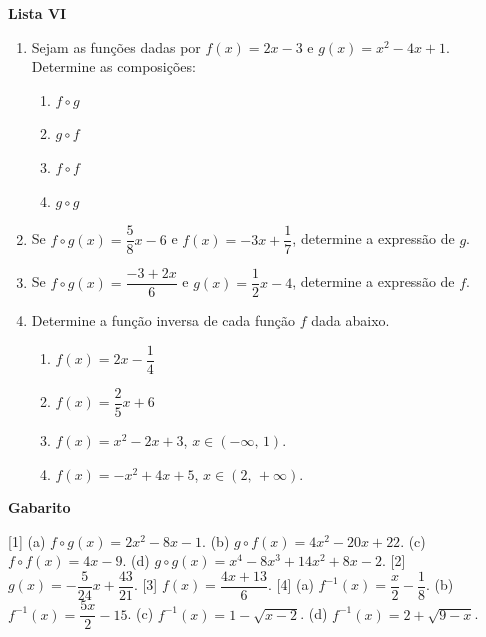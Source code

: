 \documentclass[12pt,a4paper]{article}
\begin{document}
\begin{center}
  \textbf{Lista VI}
\end{center}

\begin{enumerate}
  \item Sejam as funções dadas por $f(x) = 2x - 3$ e $g(x) = x^2 - 4x + 1$.
  Determine as composições:
    \begin{enumerate}
      \item $f\circ g$
      \item $g\circ f$
      \item $f\circ f$
      \item $g\circ g$
    \end{enumerate}

  \item Se $f\circ g(x) = \dfrac{5}{8}x - 6$ e $f(x) = -3x + \dfrac{1}{7}$,
    determine a expressão de $g$.
  
  \item Se $f\circ g(x) = \dfrac{-3 + 2x}{6}$ e $g(x) = \dfrac{1}{2}x - 4$,
    determine a expressão de $f$.

  \item Determine a função inversa de cada função $f$ dada abaixo.
    \begin{enumerate}
      \item $f(x) = 2x - \dfrac{1}{4}$
      \item $f(x) = \dfrac{2}{5}x + 6$
      \item $f(x) = x^2 - 2x + 3$, $x \in (-\infty,\,1)$.
      \item $f(x) = -x^2 + 4x + 5$, $x \in (2,\,+\infty)$.
    \end{enumerate}

\end{enumerate}

\begin{center}
  \textbf{Gabarito}
\end{center}

[1] (a) $f\circ g(x) = 2x^2 - 8x - 1$. (b) $g\circ f(x) = 4x^2 - 20x + 22$. 
(c) $f\circ f(x) = 4x - 9$. (d) $g\circ g(x) = x^4 - 8x^3 + 14x^2 + 8x - 2$. 
[2] $g(x) = -\dfrac{5}{24}x + \dfrac{43}{21}$. 
[3] $f(x) = \dfrac{4x  + 13}{6}$. 
[4] (a) $f^{-1}(x) = \dfrac{x}{2} - \dfrac{1}{8}$. 
(b) $f^{-1}(x) = \dfrac{5x}{2} - 15$.
(c) $f^{-1}(x) = 1 - \sqrt{x - 2}$. 
(d) $f^{-1}(x) = 2 + \sqrt{9 - x}$. 
\end{document}

